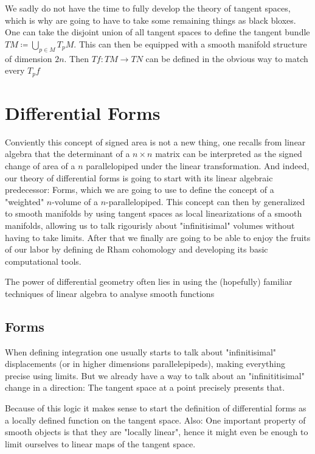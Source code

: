 We sadly do not have the time to fully develop the theory of tangent spaces, which is
why are going to have to take some remaining things as black bloxes. One can
take the disjoint union of all tangent spaces to define the tangent bundle
$TM \coloneqq \bigcup_{p \in M} T_p M$. This can then be equipped with a smooth
manifold structure of dimension $2n$. Then $Tf: TM \to TN$ can be defined in the
obvious way to match every $T_p f$

\section{Differential Forms}
Conviently this concept of signed area is not a new thing, one recalls from linear algebra that
the determinant of a $n \times n$ matrix can be interpreted as the signed change of area of a
$n$ parallelopiped under the linear transformation. And indeed, our theory of differential
forms is going to start with its linear algebraic predecessor: Forms, which we are going
to use to define the concept of a "weighted" $n$-volume of a $n$-parallelopiped. This concept
can then by generalized to smooth manifolds by using tangent spaces as local linearizations
of a smooth manifolds, allowing us to talk rigourisly about "infinitisimal" volumes without
having to take limits. After that we finally are going to be able to enjoy the fruits of our
labor by defining de Rham cohomology and developing its basic computational tools.

\begin{remark}
The power of differential geometry often lies in using the (hopefully)
familiar techniques of linear algebra to analyse smooth functions
% 
\end{remark}

\subsection*{Forms}
When defining integration one usually starts to talk about "infinitisimal"
displacements (or in higher dimensions parallelepipeds), making everything
precise using limits. But we already have a way to talk about an "infinititisimal"
change in a direction: The tangent space at a point precisely presents that.

Because of this logic it makes sense to start the definition of differential forms
as a locally defined function on the tangent space. Also: One important property of
smooth objects is that they are "locally linear", hence it might even be enough to
limit ourselves to linear maps of the tangent space.

